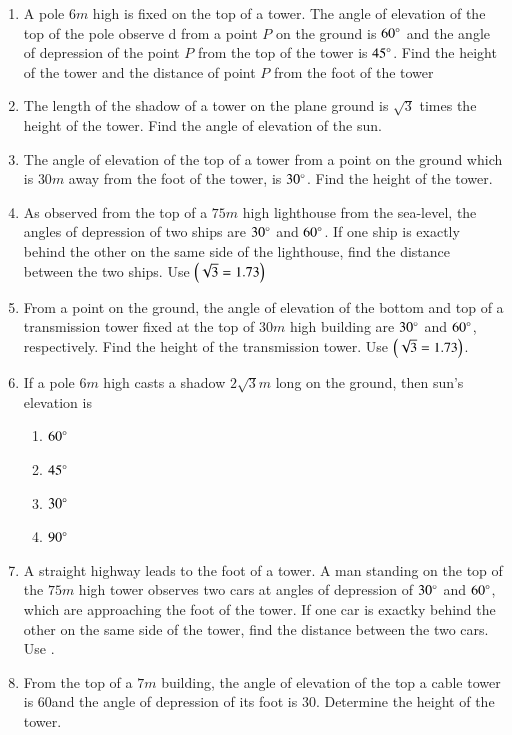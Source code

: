 \begin{enumerate}[label=\thesubsection.\arabic*.,ref=\thesubsection.\theenumi]
%
\item A pole $6m$ high is fixed on the top of a tower. The angle of elevation of the top of the pole observe
d from a point $P$ on the ground is $60\degree$ and the angle of depression of the point $P$ from the top of
 the tower is $45\degree$. Find the height of the tower and the distance of point $P$ from the foot of the tower
\hfill{}
%
\item The length of the shadow of a tower on the plane ground is $ \sqrt3 $ times the height of the tower. Find the angle of elevation of the sun.
%
\hfill{}\item The angle of elevation of the top of a tower from a point on the ground which is $30 {m}$ away from the foot of the tower, is $30\degree$. Find the height of the tower. 
\hfill{}
%
\item As observed from the top of a $75{m}$ high lighthouse from the sea-level, the angles of depression of two ships are $30\degree$ and $60\degree$. If one ship is exactly behind the other on the same side of the lighthouse, find the distance between the two ships.
	Use $\left(\sqrt{3} = 1.73\right)$
%
\hfill{}\item From a point on the ground, the angle of elevation of the bottom and top of a transmission tower fixed at the top of $30 {m}$ high building are $30\degree$ and $60\degree$, respectively. Find the height of the transmission tower. Use $\left(\sqrt{3} = 1.73\right)$.
	\hfill{}\item If a pole  $6m$ high casts a shadow $2 \sqrt{3}m$ long on the ground, then sun's elevation is
	\begin{multicols}{4}
\begin{enumerate}
\item $60\degree$
\item $45\degree$
\item $30\degree$
\item $90\degree$
	\end{enumerate}
\end{multicols}
 \hfill{}
%
\item
	A straight highway leads to the foot of a tower. A man standing on the top of the $75 {m}$ high tower observes two cars at angles of depression of $30\degree$ and $60\degree$, which are approaching the foot of the tower. If one car is exactky behind the other on the same side of the tower, find the distance between the two cars. Use .

\hfill{}\item
	From the top of a $7 {m}$ building, the angle of elevation of the top a cable tower is 60\degree and the angle of depression of its foot is 30\degree. Determine the height of the tower.
%

\hfill{}
%
\end{enumerate}
